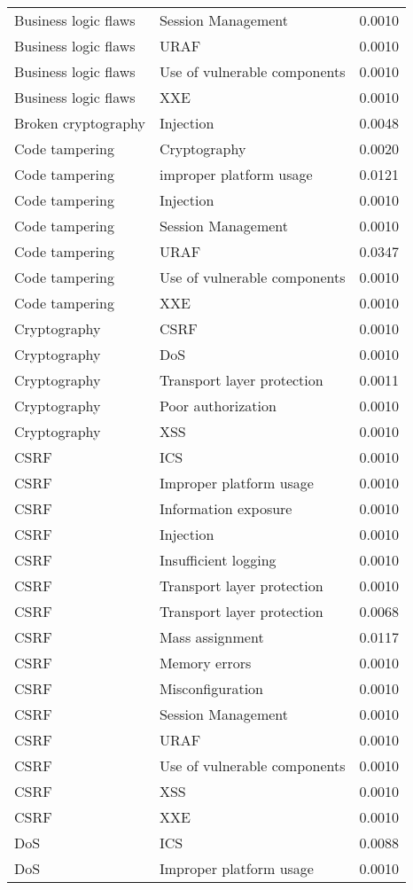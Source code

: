 {\begin{longtable}{lll}
Business logic flaws & Session Management & 0.0010\\
Business logic flaws & URAF & 0.0010\\
Business logic flaws & Use of vulnerable components & 0.0010\\
Business logic flaws & XXE & 0.0010\\
Broken cryptography & Injection & 0.0048\\
Code tampering & Cryptography & 0.0020\\
Code tampering & improper platform usage & 0.0121\\
Code tampering & Injection & 0.0010\\
Code tampering & Session Management & 0.0010\\
Code tampering & URAF & 0.0347\\
Code tampering & Use of vulnerable components & 0.0010\\
Code tampering & XXE & 0.0010\\
Cryptography & CSRF & 0.0010\\
Cryptography & DoS & 0.0010\\
Cryptography & Transport layer protection & 0.0011\\
Cryptography & Poor authorization & 0.0010\\
Cryptography & XSS & 0.0010\\
CSRF & ICS & 0.0010\\
CSRF & Improper platform usage & 0.0010\\
CSRF & Information exposure & 0.0010\\
CSRF & Injection & 0.0010\\
CSRF & Insufficient logging & 0.0010\\
CSRF & Transport layer protection & 0.0010\\
CSRF & Transport layer protection & 0.0068\\
CSRF & Mass assignment & 0.0117\\
CSRF & Memory errors & 0.0010\\
CSRF & Misconfiguration & 0.0010\\
CSRF & Session Management & 0.0010\\
CSRF & URAF & 0.0010\\
CSRF & Use of vulnerable components & 0.0010\\
CSRF & XSS & 0.0010\\
CSRF & XXE & 0.0010\\
DoS & ICS & 0.0088\\
DoS & Improper platform usage & 0.0010\\

\end{longtable}}
